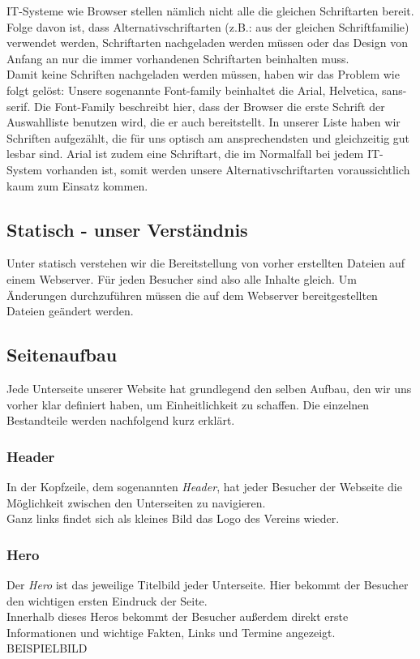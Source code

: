 \documentclass[12pt,a4paper]{article}
\begin{document}
 IT-Systeme wie Browser stellen nämlich nicht alle die gleichen Schriftarten bereit. Folge davon ist, dass Alternativschriftarten (z.B.: aus der gleichen Schriftfamilie) verwendet werden, Schriftarten nachgeladen werden müssen oder das Design von Anfang an nur die immer vorhandenen Schriftarten beinhalten muss.\\
Damit keine Schriften nachgeladen werden müssen, haben wir das Problem wie folgt gelöst: Unsere sogenannte Font-family beinhaltet die Arial, Helvetica, sans-serif.  Die Font-Family beschreibt hier, dass der Browser die erste Schrift der Auswahlliste benutzen wird, die er auch bereitstellt. In unserer Liste haben wir Schriften aufgezählt, die für uns optisch am ansprechendsten und gleichzeitig
gut lesbar sind. Arial ist zudem eine Schriftart, die im Normalfall bei jedem IT-System vorhanden ist, somit werden unsere Alternativschriftarten voraussichtlich kaum zum Einsatz kommen.

\subsection{Statisch - unser Verständnis}
Unter statisch verstehen wir die Bereitstellung von vorher erstellten Dateien auf einem Webserver. Für jeden Besucher sind also alle Inhalte gleich. Um Änderungen durchzuführen müssen die auf dem Webserver bereitgestellten Dateien geändert werden.
\subsection{Seitenaufbau}
Jede Unterseite unserer Website hat grundlegend den selben Aufbau, den wir uns vorher klar definiert haben, um Einheitlichkeit zu schaffen. Die einzelnen Bestandteile werden nachfolgend kurz erklärt.
\subsubsection{Header}
In der Kopfzeile, dem sogenannten \textit{Header}, hat jeder Besucher der Webseite die Möglichkeit zwischen den Unterseiten zu navigieren.\\
Ganz links findet sich als kleines Bild das Logo des Vereins wieder.
\subsubsection{Hero}
Der \textit{Hero} ist das jeweilige Titelbild jeder Unterseite. Hier bekommt der Besucher den wichtigen ersten Eindruck der Seite.\\
Innerhalb dieses Heros bekommt der Besucher außerdem direkt erste Informationen und wichtige Fakten, Links und Termine angezeigt.\\
BEISPIELBILD
\end{document}

